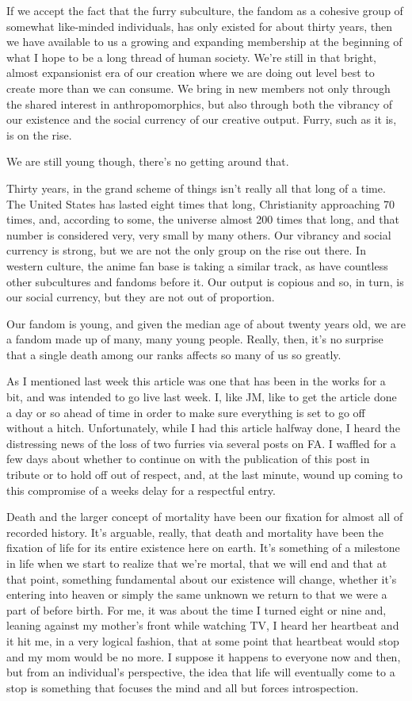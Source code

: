 If we accept the fact that the furry subculture, the fandom as a
cohesive group of somewhat like-minded individuals, has only existed for
about thirty years, then we have available to us a growing and expanding
membership at the beginning of what I hope to be a long thread of human
society. We're still in that bright, almost expansionist era of our
creation where we are doing out level best to create more than we can
consume. We bring in new members not only through the shared interest in
anthropomorphics, but also through both the vibrancy of our existence
and the social currency of our creative output. Furry, such as it is, is
on the rise.

We are still young though, there's no getting around that.

Thirty years, in the grand scheme of things isn't really all that long
of a time. The United States has lasted eight times that long,
Christianity approaching 70 times, and, according to some, the universe
almost 200 times that long, and that number is considered very, very
small by many others. Our vibrancy and social currency is strong, but we
are not the only group on the rise out there. In western culture, the
anime fan base is taking a similar track, as have countless other
subcultures and fandoms before it. Our output is copious and so, in
turn, is our social currency, but they are not out of proportion.

Our fandom is young, and given the median age of about twenty years old,
we are a fandom made up of many, many young people. Really, then, it's
no surprise that a single death among our ranks affects so many of us so
greatly.

As I mentioned last week this article was one that has been in the works
for a bit, and was intended to go live last week. I, like JM, like to
get the article done a day or so ahead of time in order to make sure
everything is set to go off without a hitch. Unfortunately, while I had
this article halfway done, I heard the distressing news of the loss of
two furries via several posts on FA. I waffled for a few days about
whether to continue on with the publication of this post in tribute or
to hold off out of respect, and, at the last minute, wound up coming to
this compromise of a weeks delay for a respectful entry.

Death and the larger concept of mortality have been our fixation for
almost all of recorded history. It's arguable, really, that death and
mortality have been the fixation of life for its entire existence here
on earth. It's something of a milestone in life when we start to realize
that we're mortal, that we will end and that at that point, something
fundamental about our existence will change, whether it's entering into
heaven or simply the same unknown we return to that we were a part of
before birth. For me, it was about the time I turned eight or nine and,
leaning against my mother's front while watching TV, I heard her
heartbeat and it hit me, in a very logical fashion, that at some point
that heartbeat would stop and my mom would be no more. I suppose it
happens to everyone now and then, but from an individual's perspective,
the idea that life will eventually come to a stop is something that
focuses the mind and all but forces introspection.

